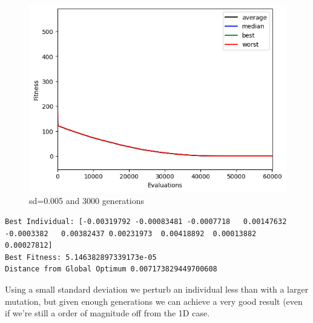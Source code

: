 \begin{figure}[H]
    \centering
    \includegraphics[width=\linewidth]{images/lab1/fitness_10D_better.png}
    \caption{sd=0.005 and 3000 generations}
\end{figure}
\begin{lstlisting}
Best Individual: [-0.00319792 -0.00083481 -0.0007718   0.00147632 -0.0003382   0.00382437 0.00231973  0.00418892  0.00013882  0.00027812]
Best Fitness: 5.146382897339173e-05
Distance from Global Optimum 0.007173829449700608
\end{lstlisting}
Using a small standard deviation we perturb an individual less than with a larger mutation, but given enough generations we can achieve a very good result (even if we're still a order of magnitude off from the 1D case.

